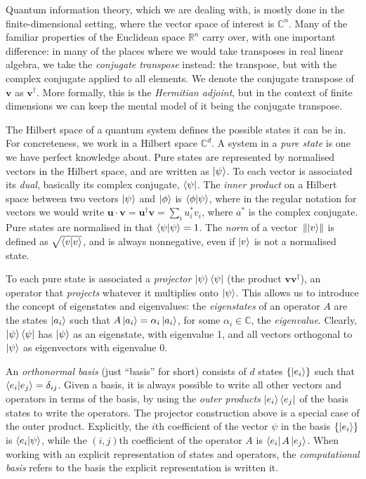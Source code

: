 \documentclass[10pt, a4paper]{article}
\numberwithin{equation}{section} %
\theoremstyle{definition}
\theoremstyle{plain}
\newcommand{\norm}[1]{\mathop{}\left\lVert#1\right\rVert}
\newcommand{\?}{\mathrel{?}} %
\newcommand{\R}{\mathbb{R}} %
\newcommand{\C}{\mathbb{C}} %
\newcommand{\cvec}[1]{\boldsymbol{\mathbf{#1}}}    %
\begin{document}
\begin{appendices}
                    Quantum information theory, which we are dealing with, is mostly done in the finite-dimensional setting, where the vector space of interest is \(\C^n\). Many of the familiar properties of the Euclidean space \(\R^n\) carry over, with one important difference: in many of the places where we would take transposes in real linear algebra, we take the \emph{conjugate transpose} instead: the transpose, but with the complex conjugate applied to all elements. We denote the conjugate transpose of \(\cvec{v}\) as \(\cvec{v}^{\dagger}\). More formally, this is the \emph{Hermitian adjoint}, but in the context of finite dimensions we can keep the mental model of it being the conjugate transpose.

                    The Hilbert space of a quantum system defines the possible states it can be in. For concreteness, we work in a Hilbert space \(\C^d\). A system in a \emph{pure state} is one we have perfect knowledge about. Pure states are represented by normalised vectors in the Hilbert space, and are written as \(\ket{\psi}\). To each vector is associated its \emph{dual}, basically its complex conjugate, \(\bra{\psi}\). The \emph{inner product} on a Hilbert space between two vectors \(\ket{\psi}\) and \(\ket{\phi}\) is \(\braket{\phi|\psi}\), where in the regular notation for vectors we would write \(\cvec{u} \cdot \cvec{v} = \cvec{u}^{\dagger}\cvec{v} = \sum_i u^*_i v_i\), where \(a^*\) is the complex conjugate. Pure states are normalised in that \(\braket{\psi|\psi}  = 1\). The \emph{norm} of a vector \(\norm{\ket{v}}\) is defined as \(\sqrt{\braket{v|v}}\), and is always nonnegative, even if \(\ket{v}\) is not a normalised state.

                    To each pure state is associated a \emph{projector} \(\ket{\psi}\bra{\psi}\) (the product \(\cvec{v}\cvec{v}^{\dagger}\)), an operator that \emph{projects} whatever it multiplies onto \(\ket{\psi}\). This allows us to introduce the concept of eigenstates and eigenvalues: the \emph{eigenstates} of an operator \(A\) are the states \(\ket{a_i}\) such that \(A\ket{a_i} = \alpha_i\ket{a_i}\), for some \(\alpha_i \in \C\), the \emph{eigenvalue}. Clearly, \(\ket{\psi}\bra{\psi}\) has \(\ket{\psi}\) as an eigenstate, with eigenvalue 1, and all vectors orthogonal to \(\ket{\psi}\) as eigenvectors with eigenvalue 0.

                    An \emph{orthonormal basis} (just ``basis'' for short) consists of \(d\) states \(\{\ket{e_i}\}\) such that \(\braket{e_i|e_j} = \delta_{ij}\). Given a basis, it is always possible to write all other vectors and operators in terms of the basis, by using the \emph{outer products} \(\ket{e_i}\bra{e_j}\) of the basis states to write the operators. The projector construction above is a special case of the outer product. Explicitly, the \(i\)th coefficient of the vector \(\psi\) in the basis \(\{\ket{e_i}\}\) is \(\braket{e_i|\psi}\), while the \((i,j)\)th coefficient of the operator \(A\) is \(\bra{e_i}A\ket{e_j}\). When working with an explicit representation of states and operators, the \emph{computational basis} refers to the basis the explicit representation is written it.


\end{appendices}
\end{document}
